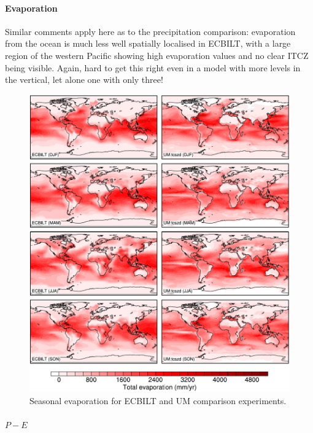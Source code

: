 \documentclass[a4paper,11pt,article]{article}
\begin{document}
\paragraph{Evaporation}

Similar comments apply here as to the precipitation comparison:
evaporation from the ocean is much less well spatially localised in
ECBILT, with a large region of the western Pacific showing high
evaporation values and no clear ITCZ being visible.  Again, hard to
get this right even in a model with more levels in the vertical, let
alone one with only three!

\begin{figure}
  \begin{center}
    \includegraphics[width=\textwidth]{control-expt-1/evap-plots}
  \end{center}
  \caption{Seasonal evaporation for ECBILT and UM comparison
    experiments.}
  \label{fig:evap}
\end{figure}

\paragraph{$P-E$}
\end{document}
